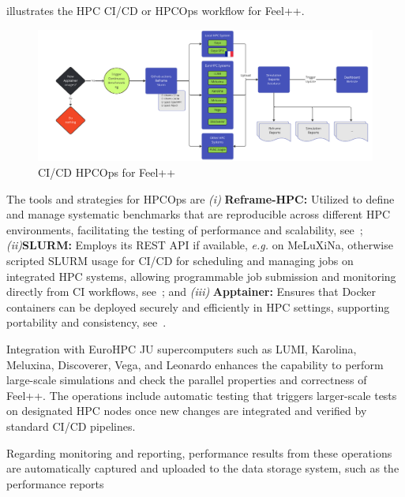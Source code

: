 \documentclass[runningheads]{llncs}
\begin{document}
 illustrates the HPC CI/CD or HPCOps workflow for Feel++.
\begin{figure}
    \centering
    \includegraphics[width=\textwidth]{img-feelpp-hpcops.pdf}
    \caption{CI/CD HPCOps for Feel++}
    \label{fig:feelpp-hpcops}
\end{figure}

The tools and strategies for HPCOps are  \textit{(i) }\textbf{Reframe-HPC:} Utilized to define and manage systematic benchmarks that are reproducible across different HPC environments, facilitating the testing of performance and scalability, see~\cite{karakasis_reframe-hpcreframe_2024};
\textit{(ii)}\textbf{SLURM:} Employs its REST API if available, \textit{e.g.} on MeLuXiNa, otherwise scripted SLURM usage for CI/CD for scheduling and managing jobs on integrated HPC systems, allowing programmable job submission and monitoring directly from CI workflows, see~\cite{slurm_development_team_slurm_2024}; and \textit{(iii)} \textbf{Apptainer:} Ensures that Docker containers can be deployed securely and efficiently in HPC settings, supporting portability and consistency, see~\cite{apptainer_contributors_apptainer_2024}.

Integration with EuroHPC JU supercomputers such as LUMI, Karolina, Meluxina, Discoverer, Vega, and Leonardo enhances the capability to perform large-scale simulations and check the parallel properties and correctness of Feel++. The operations include automatic testing that triggers larger-scale tests on designated HPC nodes once new changes are integrated and verified by standard CI/CD pipelines.

Regarding monitoring and reporting, performance results from these operations are automatically captured and uploaded to the data storage system, such as the performance reports
\end{document}
